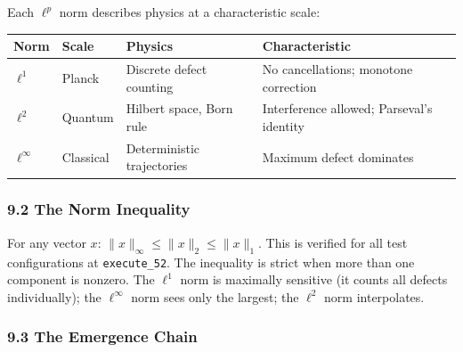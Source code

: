 \documentclass[
]{article}
\begin{document}
Each \(\ell^p\) norm describes physics at a characteristic scale:

\begin{longtable}[]{@{}
  >{\raggedright\arraybackslash}p{}
  >{\raggedright\arraybackslash}p{}
  >{\raggedright\arraybackslash}p{}
  >{\raggedright\arraybackslash}p{}@{}}
\toprule\noalign{}
\begin{minipage}[b]{\linewidth}\raggedright
Norm
\end{minipage} & \begin{minipage}[b]{\linewidth}\raggedright
Scale
\end{minipage} & \begin{minipage}[b]{\linewidth}\raggedright
Physics
\end{minipage} & \begin{minipage}[b]{\linewidth}\raggedright
Characteristic
\end{minipage} \\
\midrule\noalign{}
\endhead
\bottomrule\noalign{}
\endlastfoot
\(\ell^1\) & Planck & Discrete defect counting & No cancellations;
monotone correction \\
\(\ell^2\) & Quantum & Hilbert space, Born rule & Interference allowed;
Parseval's identity \\
\(\ell^\infty\) & Classical & Deterministic trajectories & Maximum
defect dominates \\
\end{longtable}

\subsubsection{9.2 The Norm Inequality}\label{the-norm-inequality}

For any vector \(x\): \(\|x\|_\infty \leq \|x\|_2 \leq \|x\|_1\). This
is verified for all test configurations at \texttt{execute\_52}. The
inequality is strict when more than one component is nonzero. The
\(\ell^1\) norm is maximally sensitive (it counts all defects
individually); the \(\ell^\infty\) norm sees only the largest; the
\(\ell^2\) norm interpolates.

\subsubsection{9.3 The Emergence Chain}\label{the-emergence-chain}
\end{document}

